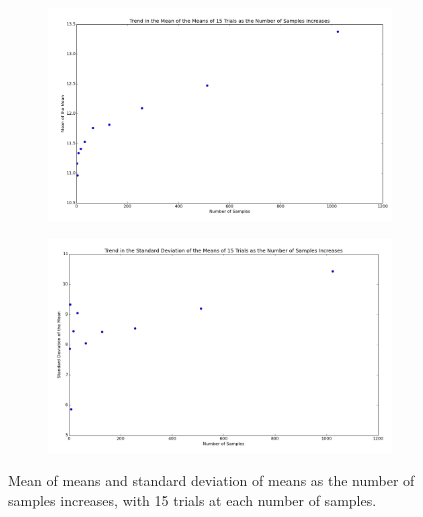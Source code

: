 \documentclass[a4paper,12pt]{article}
\begin{document}
\begin{figure}[ht]
\centering
\begin{subfigure}{\textwidth}
  \centering
  \hspace{-0.3in}
  \includegraphics[width=\linewidth]{mean_of_means.pdf}
  \label{fig:meanofmeans}
\end{subfigure}
\qquad
\begin{subfigure}{\textwidth}
  \centering
  \includegraphics[width=1\linewidth]{standard_deviation_of_means.pdf}
  \label{fig:standarddeviationofmeans}
\end{subfigure}%
\caption{Mean of means and standard deviation of means as the number of samples increases, with 15 trials at each number of samples.}
\label{fig:section9}
\end{figure}



\end{document}
